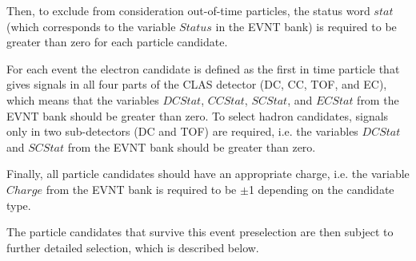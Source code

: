 Then, to exclude from consideration out-of-time particles, the status word $stat$ (which corresponds to the variable $Status$ in the EVNT bank) is required to be greater than zero for each particle candidate.

For each event the electron candidate is defined as the first in time particle that gives signals in all four parts of the CLAS detector (DC, CC, TOF, and EC), which means that the variables $DCStat$, $CCStat$, $SCStat$, and $ECStat$ from the EVNT bank should be greater than zero. To select hadron candidates, signals only in two sub-detectors (DC and TOF) are required, i.e. the variables $DCStat$ and $SCStat$ from the EVNT bank should be greater than zero.


Finally, all particle candidates should have an appropriate charge, i.e. the variable $Charge$ from the EVNT bank is required to be $\pm$1 depending on the candidate type.










The particle candidates that survive this event preselection are then subject to further detailed selection, which is described below.



